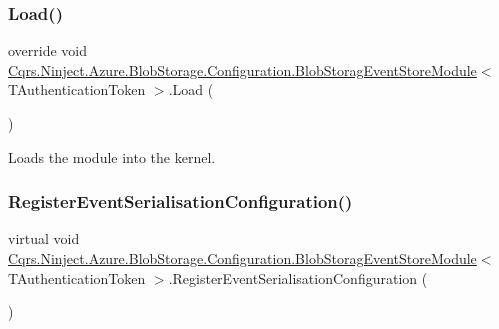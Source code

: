 \subsubsection{\texorpdfstring{Load()}{Load()}}
{\footnotesize\ttfamily override void \hyperlink{classCqrs_1_1Ninject_1_1Azure_1_1BlobStorage_1_1Configuration_1_1BlobStoragEventStoreModule}{Cqrs.\+Ninject.\+Azure.\+Blob\+Storage.\+Configuration.\+Blob\+Storag\+Event\+Store\+Module}$<$ T\+Authentication\+Token $>$.Load (\begin{DoxyParamCaption}{ }\end{DoxyParamCaption})}



Loads the module into the kernel. 

\mbox{\label{classCqrs_1_1Ninject_1_1Azure_1_1BlobStorage_1_1Configuration_1_1BlobStoragEventStoreModule_a546c871cff486df5efba7e0f9e3ceb96_a546c871cff486df5efba7e0f9e3ceb96}} 
\subsubsection{\texorpdfstring{Register\+Event\+Serialisation\+Configuration()}{RegisterEventSerialisationConfiguration()}}
{\footnotesize\ttfamily virtual void \hyperlink{classCqrs_1_1Ninject_1_1Azure_1_1BlobStorage_1_1Configuration_1_1BlobStoragEventStoreModule}{Cqrs.\+Ninject.\+Azure.\+Blob\+Storage.\+Configuration.\+Blob\+Storag\+Event\+Store\+Module}$<$ T\+Authentication\+Token $>$.Register\+Event\+Serialisation\+Configuration (\begin{DoxyParamCaption}{ }\end{DoxyParamCaption})\hspace{0.3cm}{\ttfamily [virtual]}}



